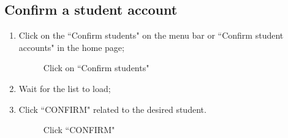 \documentclass[ManualeUtente]{subfiles}
\begin{document}
\subsection{Confirm a student account}
\begin{enumerate}
	\item Click on the \textquotedblleft Confirm students" on the menu bar or \textquotedblleft Confirm student accounts" in the home page;
	\begin{figure}[H]
		\centering
		\caption{Click on ``Confirm students"}
		\label{fig:Click on "Confirm students"}
	\end{figure}
	\item Wait for the list to load;
	\item Click \textquotedblleft CONFIRM" related to the desired student.
	\begin{figure}[H]
		\centering
		\caption{Click ``CONFIRM"}
		\label{fig:Click "CONFIRM"}
	\end{figure}
\end{enumerate}
\end{document}
